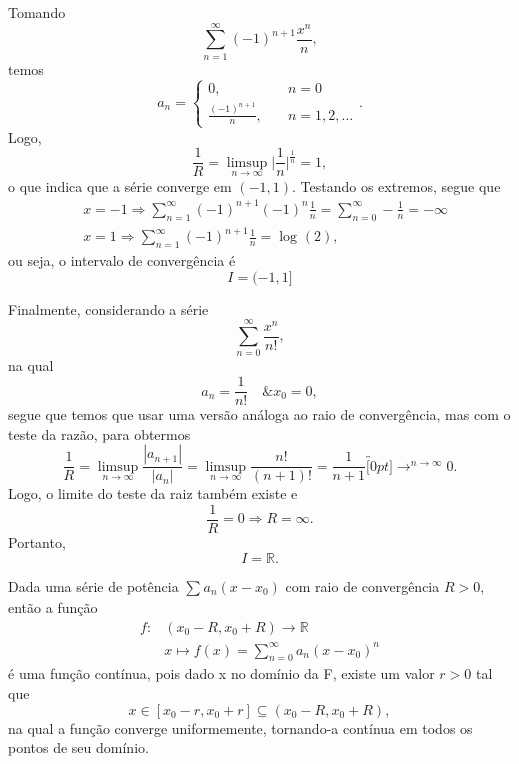 \documentclass[../analysisII_notes.tex]{subfiles}
\begin{document}
\begin{example}
	Tomando
	\[
		\sum\limits_{n=1}^{\infty}(-1)^{n+1}\frac{x^{n}}{n},
	\]
	temos
	\[
		a_{n} = \left\{\begin{array}{ll}
			0,                    & \quad n = 0            \\
			\frac{(-1)^{n+1}}{n}, & \quad n = 1, 2, \dotsc
		\end{array}\right..
	\]
	Logo,
	\[
		\frac{1}{R} = \limsup_{n\to \infty}\biggl\vert \frac{1}{n} \biggr\vert^{\frac{1}{n}} = 1,
	\]
	o que indica que a série converge em \((-1, 1)\). Testando os extremos, segue que
	\begin{align*}
		 & x = -1 \Rightarrow \sum\limits_{n=1}^{\infty}(-1)^{n+1}(-1)^{n}\frac{1}{n} = \sum\limits_{n=0}^{\infty}-\frac{1}{n} = -\infty \\
		 & x = 1 \Rightarrow \sum\limits_{n=1}^{\infty}(-1)^{n+1}\frac{1}{n} = \log^{}{(2)},
	\end{align*}
	ou seja, o intervalo de convergência é
	\[
		I = (-1, 1]
	\]
\end{example}
\begin{example}
	Finalmente, considerando a série
	\[
		\sum\limits_{n=0}^{\infty}\frac{x^{n}}{n!},
	\]
	na qual
	\[
		a_{n} = \frac{1}{n!} \quad\& x_{0} = 0,
	\]
	segue que temos que usar uma versão análoga ao raio de convergência, mas com o teste da razão, para obtermos
	\[
		\frac{1}{R} = \limsup_{n\to \infty}\frac{|a_{n+1}|}{|a_{n}|} = \limsup_{n\to \infty}\frac{n!}{(n+1)!} = \frac{1}{n+1} \overbracket[0pt]{\longrightarrow}^{n\to \infty}0.
	\]
	Logo, o limite do teste da raiz também existe e
	\[
		\frac{1}{R} = 0 \Rightarrow R = \infty.
	\]
	Portanto,
	\[
		I = \mathbb{R}.
	\]
\end{example}
\begin{tcolorbox}[
		skin=enhanced,
		title=Observação,
		fonttitle=\bfseries,
		colframe=black,
		colbacktitle=cyan!75!white,
		colback=cyan!15,
		colbacklower=black,
		coltitle=black,
		drop fuzzy shadow,
	]
	Dada uma série de potência \(\sum\limits_{}^{}a_{n}(x-x_{0})\) com raio de convergência \(R > 0\), então a função
	\begin{align*}
		f: & (x_{0}-R, x_{0}+R)\rightarrow \mathbb{R}                   \\
		   & x\mapsto f(x)=\sum\limits_{n=0}^{\infty}a_{n}(x-x_{0})^{n}
	\end{align*}
	é uma função contínua, pois dado x no domínio da F, existe um valor \(r > 0\) tal que
	\[
		x\in [x_{0}-r, x_{0}+r]\subseteq (x_{0}-R, x_{0}+R),
	\]
	na qual a função converge uniformemente, tornando-a contínua em todos os pontos de seu domínio.
\end{tcolorbox}
\end{document}
